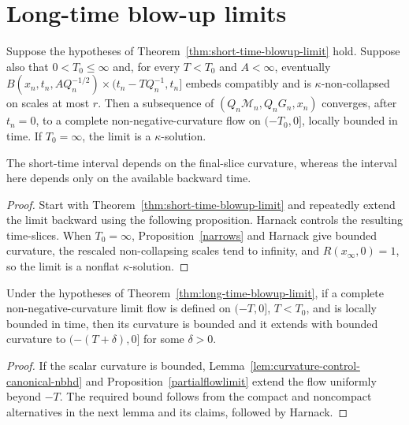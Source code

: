 \section{Long-time blow-up limits}

\begin{theorem}
\label{thm:long-time-blowup-limit}
\label{kaplimit}
Suppose the hypotheses of Theorem~\ref{thm:short-time-blowup-limit} hold.
Suppose also that $0<T_0\le\infty$ and, for every $T<T_0$ and $A<\infty$,
eventually $B(x_n,t_n,AQ_n^{-1/2})\times(t_n-TQ_n^{-1},t_n]$ embeds compatibly
and is $\kappa$-non-collapsed on scales at most $r$. Then a subsequence of
$(Q_n{\mathcal M}_n,Q_nG_n,x_n)$ converges, after $t_n=0$, to a complete
non-negative-curvature flow on $(-T_0,0]$, locally bounded in time. If
$T_0=\infty$, the limit is a $\kappa$-solution.
\end{theorem}
\begin{remark}
\label{rem:comparison-short-and-long-time-limits}
The short-time interval depends on the final-slice curvature, whereas the
interval here depends only on the available backward time.
\end{remark}
\begin{proof}
\sketch Start with Theorem~\ref{thm:short-time-blowup-limit} and repeatedly
extend the limit backward using the following proposition. Harnack controls
the resulting time-slices. When $T_0=\infty$, Proposition~\ref{narrows} and
Harnack give bounded curvature, the rescaled non-collapsing scales tend to
infinity, and $R(x_\infty,0)=1$, so the limit is a nonflat $\kappa$-solution.
\end{proof}

\begin{proposition}
\label{prop:extend-limit-flow-backward}
\label{maxT}
Under the hypotheses of Theorem~\ref{thm:long-time-blowup-limit}, if a complete
non-negative-curvature limit flow is defined on $(-T,0]$, $T<T_0$, and is
locally bounded in time, then its curvature is bounded and it extends with
bounded curvature to $(-(T+\delta),0]$ for some $\delta>0$.
\end{proposition}
\begin{proof}
\sketch If the scalar curvature is bounded, Lemma~\ref{lem:curvature-control-canonical-nbhd}
and Proposition~\ref{partialflowlimit} extend the flow uniformly beyond $-T$.
The required bound follows from the compact and noncompact alternatives in
the next lemma and its claims, followed by Harnack.
\end{proof}

